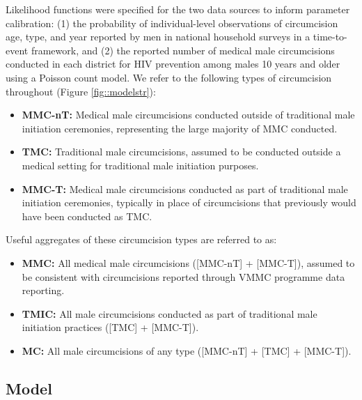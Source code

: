 \documentclass{article}
\begin{document}
Likelihood functions were specified for the two data sources to inform parameter calibration: (1) the probability of individual-level observations of circumcision age, type, and year reported by men in national household surveys in a time-to-event framework, and (2) the reported number of medical male circumcisions conducted in each district for HIV prevention among males 10 years and older using a Poisson count model. We refer to the following types of circumcision throughout (Figure \ref{fig::modelstr}):
\begin{itemize}
    \item \textbf{MMC-nT:} Medical male circumcisions conducted outside of traditional male initiation ceremonies, representing the large majority of MMC conducted.
    \item \textbf{TMC:} Traditional male circumcisions, assumed to be conducted outside a medical setting for traditional male initiation purposes.
    \item \textbf{MMC-T:} Medical male circumcisions conducted as part of traditional male initiation ceremonies, typically in place of circumcisions that previously would have been conducted as TMC.
\end{itemize}
Useful aggregates of these circumcision types are referred to as:
\begin{itemize}
    \item \textbf{MMC:} All medical male circumcisions ([MMC-nT] + [MMC-T]), assumed to be consistent with circumcisions reported through VMMC programme data reporting.
    \item \textbf{TMIC:} All male circumcisions conducted as part of traditional male initiation practices ([TMC] + [MMC-T]).
    \item \textbf{MC:} All male circumcisions of any type ([MMC-nT] + [TMC] + [MMC-T]).
\end{itemize}


\subsection*{Model}
\label{sec::model}

\end{document}
